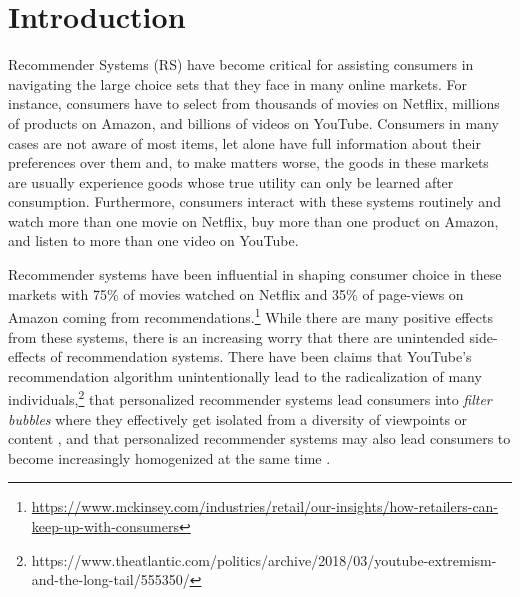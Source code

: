 \documentclass[sigconf, anonymous, review]{acmart}
\begin{document}
%

%

\maketitle

\section{Introduction}

Recommender Systems (RS) have become critical for assisting consumers in navigating the large choice sets that they face in many online markets. For instance, consumers have to select from thousands of movies on Netflix, millions of products on Amazon, and billions of videos on YouTube. Consumers in many cases are not aware of most items, let alone have full information about their preferences over them and, to make matters worse, the goods in these markets are usually experience goods whose true utility can only be learned after consumption. Furthermore, consumers interact with these systems routinely and watch more than one movie on Netflix, buy more than one product on Amazon, and listen to more than one video on YouTube.
\par

Recommender systems have been influential in shaping consumer choice in these markets with 75\% of movies watched on Netflix and 35\% of page-views on Amazon coming from recommendations.\footnote{\url{https://www.mckinsey.com/industries/retail/our-insights/how-retailers-can-keep-up-with-consumers}} While there are many positive effects from these systems, there is an increasing worry that there are unintended side-effects of recommendation systems. There have been claims that YouTube's recommendation algorithm unintentionally lead to the radicalization of many individuals,\footnote{https://www.theatlantic.com/politics/archive/2018/03/youtube-extremism-and-the-long-tail/555350/} that personalized recommender systems lead consumers into \textit{filter bubbles} where they effectively get isolated from a diversity of viewpoints or content \cite{pariser2011filter}, and that personalized recommender systems may also lead consumers to become increasingly homogenized at the same time \cite{chaney2018algorithmic, hosanagar2013will}.
\par
\end{document}
